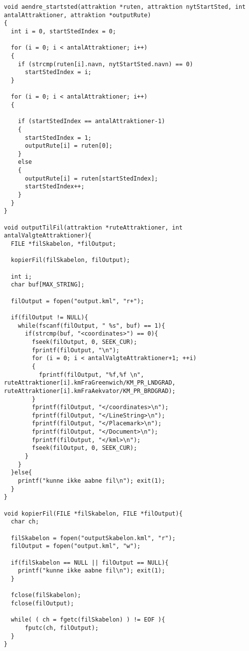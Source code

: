 \begin{lstlisting}
void aendre_startsted(attraktion *ruten, attraktion nytStartSted, int antalAttraktioner, attraktion *outputRute)
{
  int i = 0, startStedIndex = 0;

  for (i = 0; i < antalAttraktioner; i++)
  {
    if (strcmp(ruten[i].navn, nytStartSted.navn) == 0)
      startStedIndex = i;
  }

  for (i = 0; i < antalAttraktioner; i++)
  {

    if (startStedIndex == antalAttraktioner-1)
    {
      startStedIndex = 1;
      outputRute[i] = ruten[0];
    }
    else
    {
      outputRute[i] = ruten[startStedIndex];
      startStedIndex++;
    }
  }
}

void outputTilFil(attraktion *ruteAttraktioner, int antalValgteAttraktioner){
  FILE *filSkabelon, *filOutput;

  kopierFil(filSkabelon, filOutput);

  int i;
  char buf[MAX_STRING];

  filOutput = fopen("output.kml", "r+");

  if(filOutput != NULL){
    while(fscanf(filOutput, " %s", buf) == 1){
      if(strcmp(buf, "<coordinates>") == 0){
        fseek(filOutput, 0, SEEK_CUR);
        fprintf(filOutput, "\n");
        for (i = 0; i < antalValgteAttraktioner+1; ++i)
        {
          fprintf(filOutput, "%f,%f \n", ruteAttraktioner[i].kmFraGreenwich/KM_PR_LNDGRAD, ruteAttraktioner[i].kmFraAekvator/KM_PR_BRDGRAD);
        }
        fprintf(filOutput, "</coordinates>\n");
        fprintf(filOutput, "</LineString>\n");
        fprintf(filOutput, "</Placemark>\n");
        fprintf(filOutput, "</Document>\n");
        fprintf(filOutput, "</kml>\n");
        fseek(filOutput, 0, SEEK_CUR);
      }
    }
  }else{
    printf("kunne ikke aabne fil\n"); exit(1);
  }
}

void kopierFil(FILE *filSkabelon, FILE *filOutput){
  char ch;

  filSkabelon = fopen("outputSkabelon.kml", "r");
  filOutput = fopen("output.kml", "w");

  if(filSkabelon == NULL || filOutput == NULL){
    printf("kunne ikke aabne fil\n"); exit(1);
  }

  fclose(filSkabelon);
  fclose(filOutput);  

  while( ( ch = fgetc(filSkabelon) ) != EOF ){
      fputc(ch, filOutput);
  } 
}

\end{lstlisting}